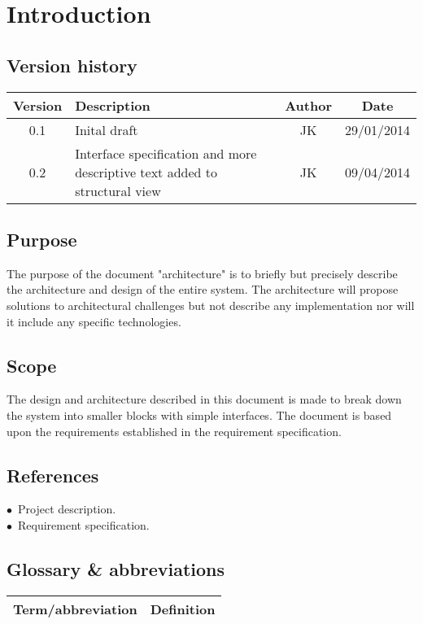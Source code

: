 \chapter{Introduction}
\section{Version history}
\begin{table}[H]
\begin{tabular}{|c|p{9cm}|c|c|}
\hline
Version & Description & Author & Date\\
\hline
0.1 & Inital draft & JK & 29/01/2014\\
\hline
0.2 & Interface specification and more descriptive text added to structural view & JK & 09/04/2014\\ \hline
\end{tabular}
\end{table}

\section{Purpose}
The purpose of the document "architecture" is to briefly but precisely describe the architecture and design of the entire system. The architecture will propose solutions to architectural challenges but not describe any implementation nor will it include any specific technologies.

\section{Scope}
The design and architecture described in this document is made to break down the system into smaller blocks with simple interfaces. The document is based upon the requirements established in the requirement specification.

\section{References}
$\bullet$\ Project description.\\
$\bullet$\ Requirement specification.\\



\section{Glossary \& abbreviations}
\begin{table}[H]
\centering
\begin{tabular}{|p{4cm}|p{7cm}|}
\hline
Term/abbreviation & Definition\\ \hline
\end{tabular}
\end{table}
